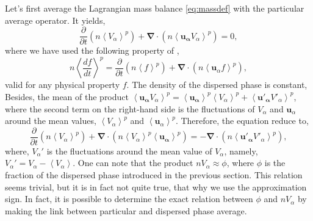 Let's first average the Lagrangian mass balance \ref{eq:massdef} with the particular average operator.
It yields,   
\begin{equation}
    \label{eq:LpolyMassCons}
    \frac{\partial }{\partial t}(n\left<V_\alpha\right>^p) 
    + \bm{\nabla}\cdot(n\left<\bm{u_\alpha}V_\alpha\right>^p)
    = 0,
\end{equation}  
where we have used the following property of \citep{anderson1967fluid},
\begin{equation*}
    n \left<\frac{d f}{dt}\right>^p 
    = \frac{\partial }{\partial t}(n\left<f\right>^p) 
    + \bm{\nabla}\cdot(n\left<\bm{u}_\alpha f\right>^p),
\end{equation*}
valid for any physical property $f$.
The density of the dispersed phase is constant,
Besides, the mean of the product $\left<\bm{u_\alpha}V_\alpha\right>^p = \left<\bm{u_\alpha}\right>^p\left<V_\alpha\right>^p+\left<\bm{u'_\alpha}V'_\alpha\right>^p$, where the second term on the right-hand side is the fluctuations of $V_\alpha$ and $\bm{u}_\alpha$ around the mean values, $\left<V_\alpha\right>^p$ and $\left<\bm{u}_\alpha\right>^p$. 
Therefore, the equation reduce to,
\begin{equation}
    \frac{\partial }{\partial t}(n\left<V_\alpha\right>^p) 
    + \bm{\nabla}\cdot(n\left<V_\alpha\right>^p\left<\bm{u_\alpha}\right>^p )
    = 
    - \bm{\nabla}\cdot(n\left<\bm{u'_\alpha}V'_\alpha\right>^p),
    \label{eq:pmassavg}
\end{equation}  
where, $V_\alpha'$ is the fluctuations around the mean value of $V_\alpha$,
namely, $V_\alpha' = V_\alpha - \left<V_\alpha\right>$.
One can note that the product $nV_\alpha \approx \phi$, where $\phi$ is the fraction of the dispersed phase introduced in the previous section. 
This relation seems trivial, but it is in fact not quite true, that why we use the approximation sign. 
In fact, it is possible to determine the exact relation between $\phi$ and $nV_\alpha$ by making the link between particular and dispersed phase average.

